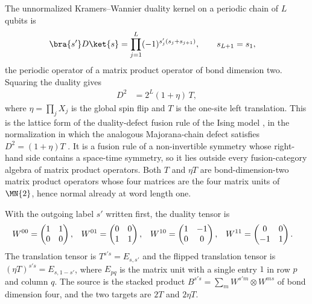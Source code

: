 The unnormalized Kramers--Wannier duality kernel on a periodic chain of $L$
qubits is
\begin{align}
    \bra{s'}D\ket{s} & =\prod_{j=1}^{L}(-1)^{s'_j(s_j+s_{j+1})},
    \qquad s_{L+1}=s_1,
    \label{eq:asymex_kw_kernel}
\end{align}
the periodic operator of a matrix product operator of bond dimension two.
Squaring the duality gives
\begin{align}
    D^2 & =2^L(1+\eta)\,T,
    \label{eq:asymex_kw_fusion}
\end{align}
where $\eta=\prod_jX_j$ is the global spin flip and $T$ is the one-site
left translation. This is the lattice form of the duality-defect fusion
rule of the Ising model \cite{Aasen2016Topological}, in the normalization in
which the analogous Majorana-chain defect satisfies $D^2=(1+\eta)T$
\cite{Seiberg2024Majorana}. It is a fusion rule of a non-invertible
symmetry whose right-hand side contains a space-time symmetry, so it lies
outside every fusion-category algebra of matrix product operators. Both
$T$ and $\eta T$ are bond-dimension-two matrix product operators whose four
matrices are the four matrix units of $\MN{2}$, hence normal already at
word length one.

\begin{definition}
    \label{def:asymex_kw}
    \leanok
    With the outgoing label $s'$ written first, the duality tensor is
    \begin{align}
        W^{00} & =\begin{pmatrix}1&1\\0&0\end{pmatrix},
               &
        W^{01} & =\begin{pmatrix}0&0\\1&1\end{pmatrix},
               &
        W^{10} & =\begin{pmatrix}1&-1\\0&0\end{pmatrix},
               &
        W^{11} & =\begin{pmatrix}0&0\\-1&1\end{pmatrix}.
        \notag
    \end{align}
    The translation tensor is $T^{s's}=E_{s,s'}$ and the flipped
    translation tensor is $(\eta T)^{s's}=E_{s,1-s'}$, where $E_{pq}$ is
    the matrix unit with a single entry $1$ in row $p$ and column $q$. The
    source is the stacked product $B^{s's}=\sum_mW^{s'm}\otimes W^{ms}$ of
    bond dimension four, and the two targets are $2T$ and $2\eta T$.
\end{definition}

